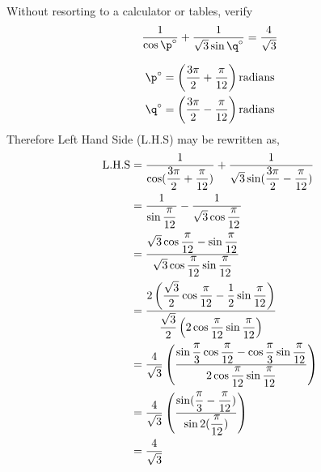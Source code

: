 
\va\p
{}\va\q

\question[5] Without resorting to a calculator or tables, verify
\begin{align}
  \dfrac{1}{\cos \p^\circ}+\dfrac{1}{\sqrt{3}\sin \q^\circ} 
    = \dfrac{4}{\sqrt{3}} \nonumber
\end{align}

\begin{solution}[\fullpage]
  \begin{align}
    \p^\circ &= \left(\dfrac{3\pi}{2}+\vb\right) 
      \text{radians} \\
    \q^\circ &= \left(\dfrac{3\pi}{2}-\vb\right) 
      \text{radians}
  \end{align}
  Therefore Left Hand Side (L.H.S) may be rewritten as,
  \begin{align}
    \text{L.H.S} &= \dfrac{1}{\cos(\dfrac{3\pi}{2}+\dfrac{\pi}{12})}+
      				  \dfrac{1}{\sqrt{3}
      				    \sin(\dfrac{3\pi}{2}-\dfrac{\pi}{12})} \\
      		     &= \dfrac{1}{\sin\dfrac{\pi}{12}}-
      				  \dfrac{1}{\sqrt{3}\cos\dfrac{\pi}{12}} \\
      		     &= \dfrac{\sqrt{3}\cos\dfrac{\pi}{12}-\sin\dfrac{\pi}{12}}
      		              {\sqrt{3}\cos\dfrac{\pi}{12}\sin\dfrac{\pi}{12}} \\
      		     &= \dfrac{2\left(\dfrac{\sqrt{3}}{2}\cos\dfrac{\pi}{12}-
      		                  \dfrac{1}{2}\sin\dfrac{\pi}{12}\right)}
            		        {\dfrac{\sqrt{3}}{2}\left(2\cos\dfrac{\pi}{12}
            		            \sin\dfrac{\pi}{12}\right)} \\
      		     &= \dfrac{4}{\sqrt{3}}\left(
      		          \dfrac{\sin \dfrac{\pi}{3}\cos\dfrac{\pi}{12}-
      		                 \cos \dfrac{\pi}{3}\sin\dfrac{\pi}{12}}
            		          {2\cos\dfrac{\pi}{12}\sin\dfrac{\pi}{12}}\right) \\
      		     &= \dfrac{4}{\sqrt{3}}\left(
      		          \dfrac{\sin(\dfrac{\pi}{3}-\dfrac{\pi}{12})}
      		                {\sin 2(\dfrac{\pi}{12})}\right) \\
      		     &= \dfrac{4}{\sqrt{3}}
  \end{align}
\end{solution}
